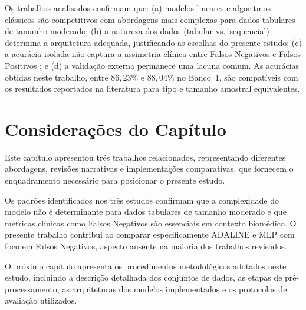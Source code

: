 Os trabalhos analisados confirmam que: (a) modelos lineares e algoritmos cl\'assicos s\~ao competitivos com abordagens mais complexas para dados tabulares de tamanho moderado; (b) a natureza dos dados (tabular vs.\ sequencial) determina a arquitetura adequada, justificando as escolhas do presente estudo; (c) a acur\'acia isolada n\~ao captura a assimetria cl\'inica entre Falsos Negativos e Falsos Positivos \cite{mesquita2020}; e (d) a valida\c c\~ao externa permanece uma lacuna comum. As acur\'acias obtidas neste trabalho, entre $86{,}23\%$ e $88{,}04\%$ no Banco~1, s\~ao compat\'iveis com os resultados reportados na literatura para tipo e tamanho amostral equivalentes.


\section{Considera\c c\~oes do Cap\'itulo}

Este capítulo apresentou três trabalhos relacionados, representando diferentes abordagens, revisões narrativas e implementações comparativas, que fornecem o enquadramento necessário para posicionar o presente estudo.

Os padrões identificados nos três estudos confirmam que a complexidade do modelo não é determinante para dados tabulares de tamanho moderado e que métricas clínicas como Falsos Negativos são essenciais em contexto biomédico. O presente trabalho contribui ao comparar especificamente ADALINE e MLP com foco em Falsos Negativos, aspecto ausente na maioria dos trabalhos revisados.

O pr\'oximo cap\'itulo apresenta os procedimentos metodol\'ogicos adotados neste estudo, incluindo a descri\c c\~ao detalhada dos conjuntos de dados, as etapas de pr\'e-processamento, as arquiteturas dos modelos implementados e os protocolos de avalia\c c\~ao utilizados.
